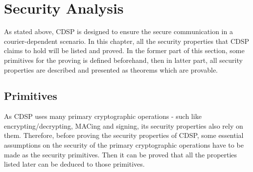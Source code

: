 \chapter{Security Analysis}
As stated above, CDSP is designed to ensure the secure communication in a courier-dependent scenario. In this chapter, all the security properties that CDSP claims to hold will be listed and proved. In the former part of this section, some primitives for the proving is defined beforehand, then in latter part, all security properties are described and presented as theorems which are provable.

\section{Primitives}
As CDSP uses many primary cryptographic operations - such like encrypting/decrypting, MACing and signing, its security properties also rely on them. Therefore, before proving the security properties of CDSP, some essential assumptions on the security of the primary cryptographic operations have to be made as the security primitives. Then it can be proved that all the properties listed later can be deduced to those primitives.
